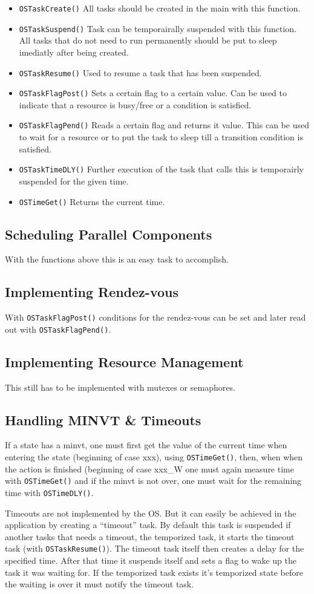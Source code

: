 \documentclass[../main.tex]{subfiles}
\begin{document}
\begin{itemize}
	\item \lstinline{OSTaskCreate()} All tasks should be created in the main with this function.
	\item \lstinline{OSTaskSuspend()} Task can be temporairally suspended with this function. All tasks that do not need to run permanently should be put to sleep imediatly after being created.
	\item \lstinline{OSTaskResume()} Used to resume a task that has been suspended.
	\item \lstinline{OSTaskFlagPost()} Sets a certain flag to a certain value. Can be used to indicate that a resource is busy/free or a condition is satisfied.
	\item \lstinline{OSTaskFlagPend()} Reads a certain flag and returns it value. This can be used to wait for a resource or to put the task to sleep till a transition condition is satisfied.
	\item \lstinline{OSTaskTimeDLY()} Further execution of the task that calls this is temporairly suspended for the given time.
	\item \lstinline{OSTimeGet()} Returns the current time.
\end{itemize}

\subsection{Scheduling Parallel Components}
With the functions above this is an easy task to accomplish.
\subsection{Implementing Rendez-vous}
With \lstinline{OSTaskFlagPost()} conditions for the rendez-vous can be set and later read out with \lstinline{OSTaskFlagPend()}.
\subsection{Implementing Resource Management}
This still has to be implemented with mutexes or semaphores.

\subsection{Handling MINVT \& Timeouts}
If a state has a minvt, one must first get the value of the current time when entering the state (beginning of case xxx), using \lstinline{OSTimeGet()}, then, when when the action is finished (beginning of case xxx\_W one must again measure time with \lstinline{OSTimeGet()} and if the minvt is not over, one must wait for the remaining time with \lstinline{OSTimeDLY()}.

Timeouts are not implemented by the OS.
But it can easily be achieved in the application by creating a ``timeout'' task.
By default this task is suspended if another tasks that needs a timeout, the temporized task, it starts the timeout task (with \lstinline{OSTaskResume()}).
The timeout task itself then creates a delay for the specified time. After that time it suspends itself and sets a flag to wake up the task it was waiting for.
If the temporized task exists it's temporized state before the waiting is over it must notify the timeout task.
\end{document}
